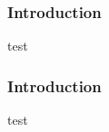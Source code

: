 \documentclass[unknownkeysallowed]{beamer}
\begin{document}
\begin{frame}
\frametitle{Introduction}
test
\end{frame}

\begin{frame}
\frametitle{Introduction}
test
\end{frame}
\end{document}

